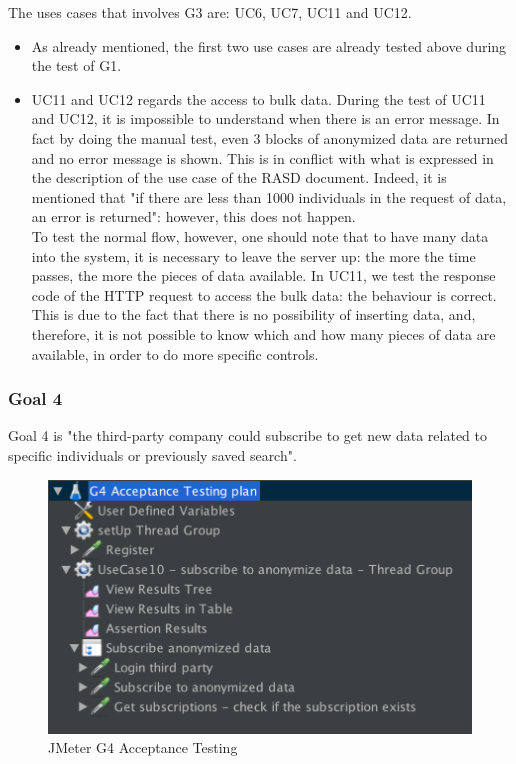 The uses cases that involves G3 are: UC6, UC7, UC11 and UC12.  

\begin{itemize}
\item 
As already mentioned, the first two use cases are already tested above during the test of G1.

\item 
UC11 and UC12 regards the access to bulk data.
During the test of UC11 and UC12, it is impossible to understand when there is an error message. 
In fact by doing the manual test, even 3 blocks of anonymized data are returned and no error message is shown. 
This is in conflict with what is expressed in the description of the use case of the RASD document. 
Indeed, it is mentioned that "if there are less than 1000 individuals in the request of data, an error is returned":
however, this does not happen. \\
To test the normal flow, however, one should note that to have many data into the system, it is necessary to leave the server up: the more the
time passes, the more the pieces of data available. In UC11, we test the response code of the HTTP request to access the bulk data: the
behaviour is correct. This is due to the fact that there is no possibility of inserting data, and, therefore, it is not possible to know which
and how many pieces of data are available, in order to do more specific controls. 

\end{itemize}

\subsubsection{Goal 4}
Goal 4 is "the third-party company could subscribe to get new data related to specific
individuals or previously saved search".

\begin{figure}[H]
\includegraphics[width=0.7\linewidth]{images/goal4}
\centering
\caption{ JMeter G4 Acceptance Testing }
\label{fig:goal4}
\end{figure}

